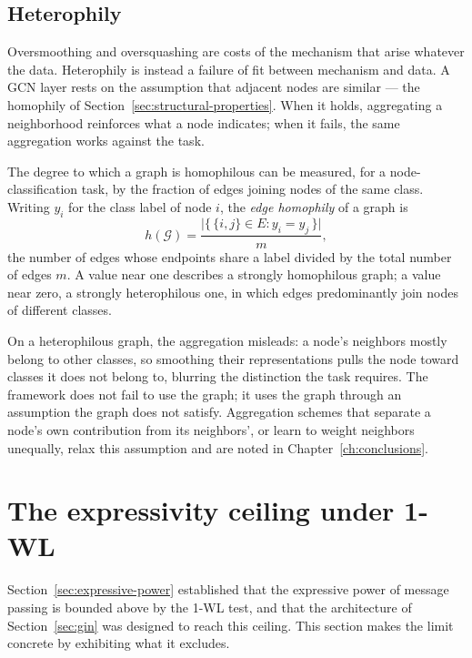 \subsection{Heterophily}
\label{sec:heterophily}

Oversmoothing and oversquashing are costs of the mechanism that arise whatever the
data. Heterophily is instead a failure of fit between mechanism and data.
A GCN layer rests on the assumption that
adjacent nodes are similar --- the homophily of
Section~\ref{sec:structural-properties}.
When it holds, aggregating a neighborhood
reinforces what a node indicates; when it fails, the same aggregation works against
the task.

The degree to which a graph is homophilous can be measured, for a
node-classification task, by the fraction of edges joining nodes of the same class.
Writing $y_i$ for the class label of node $i$, the \textit{edge homophily} of a
graph is
\begin{equation}
  h(\mathcal{G})
    = \frac{\bigl\lvert
        \{\, \{i, j\} \in E : y_i = y_j \,\}
      \bigr\rvert}{m},
  \label{eq:edge-homophily}
\end{equation}
the number of edges whose endpoints share a label divided by the total number of
edges $m$. A value near one describes a strongly homophilous graph; a value near
zero, a strongly heterophilous one, in which edges predominantly join nodes of
different classes.

On a heterophilous graph, the aggregation misleads: a node's neighbors mostly
belong to other classes, so smoothing their representations pulls the node toward
classes it does not belong to, blurring the distinction the task requires. 
The framework does not fail to use the graph;
it uses the graph through an assumption the graph does not satisfy. Aggregation
schemes that separate a node's own contribution from its neighbors', or learn to
weight neighbors unequally, relax this assumption and are noted in
Chapter~\ref{ch:conclusions}.

\section{The expressivity ceiling under 1-WL}
\label{sec:expressivity-ceiling}

Section~\ref{sec:expressive-power} established that the expressive power of message
passing is bounded above by the \mbox{1-WL} test, and that the architecture of
Section~\ref{sec:gin} was designed to reach this ceiling. 
This section makes the limit concrete by exhibiting what it excludes.

